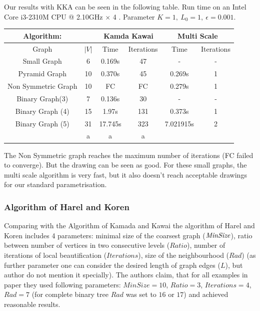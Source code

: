 \documentclass[12pt,a4paper]{article}
\begin{document}
Our results with KKA can be seen in the following table. Run time on an  Intel Core i3-2310M CPU @ 2.10GHz $\times$ 4 . Parameter $K=1, \ L_0 = 1, \ \epsilon = 0.001$.
\begin{table}

\begin{tabular}{|c|c||c|c|c|c|}
\hline
Algorithm: & & \multicolumn{2}{|c|}{Kamda Kawai} &  \multicolumn{2}{|c|}{Multi Scale}  \\
\hline
\hline 
Graph & $|V|$ & Time & Iterations & Time & Iterations\\ 
\hline
Small Graph & 6 & 0.169s & 47 &- & -\\ 
\hline 
Pyramid Graph & 10 & 0.370s & 45 &0.269s & 1 \\ 
\hline 
Non Symmetric Graph & 10 & FC & FC & 0.279s & 1\\ 
\hline 
Binary Graph(3) & 7 & 0.136s & 30 & -&-\\ 
\hline 
Binary Graph (4) & 15 & 1.97s & 131 & 0.373s& 1 \\ 
\hline 
Binary Graph (5) & 31 & 17.745s & 323 &7.021915s & 2 \\ 
\hline  & a & a & a	& & \\ 
\hline 
\end{tabular} 
\end{table}
The Non Symmetric graph reaches the maximum number of iterations (FC failed to converge). But the drawing can be seen as good. For these small graphs, the multi scale algorithm is very fast, but it also doesn't reach acceptable drawings for our standard parametrisation.


\FloatBarrier 
\subsubsection*{Algorithm of Harel and Koren}

Comparing with the Algorithm of Kamada and Kawai the algorithm of Harel and Koren includes 4 parameters: minimal size of the coarsest graph ($\it MinSize$), ratio between number of vertices in two consecutive levels ($Ratio$), number of iterations of local beautification ($Iterations$), size of the neighbourhood ($Rad$) (as further parameter one can consider the desired length of graph edges ($L$), but author do not mention it specially). The authors claim, that for all examples in paper they used following parameters: $MinSize=10$, $Ratio=3$, $Iterations=4$, $Rad = 7$ (for complete binary tree $Rad$ was set to $16$ or $17$) and achieved reasonable results.
\end{document}
